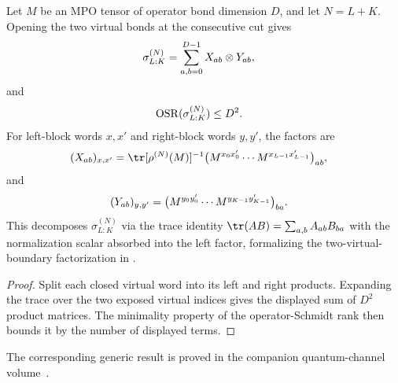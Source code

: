 \begin{lemma}
    \label{thm:mpdo_periodic_cut_operator_schmidt_rank}
    \leanok
    Let $M$ be an MPO tensor of operator bond dimension $D$, and let
    $N=L+K$. Opening the two virtual bonds at the consecutive cut gives
    \begin{align}
        \sigma^{(N)}_{L:K}
         & =\sum_{a,b=0}^{D-1} X_{ab}\otimes Y_{ab},
        \notag
    \end{align}
    and
    \begin{align}
        \operatorname{OSR}(\sigma^{(N)}_{L:K}) & \leq D^2.
        \notag
    \end{align}
    For left-block words $x,x'$ and right-block words $y,y'$, the factors are
    \begin{align}
        (X_{ab})_{x,x'}
         & =\tr[\rho^{(N)}(M)]^{-1}
        \bigl(M^{x_0x'_0}\cdots M^{x_{L-1}x'_{L-1}}\bigr)_{ab},
        \notag
    \end{align}
    and
    \begin{align}
        (Y_{ab})_{y,y'}
         & =\bigl(M^{y_0y'_0}\cdots M^{y_{K-1}y'_{K-1}}\bigr)_{ba}.
        \notag
    \end{align}
    This decomposes $\sigma^{(N)}_{L:K}$ via the trace identity
    $\tr(AB)=\sum_{a,b}A_{ab}B_{ba}$ with the normalization scalar absorbed into
    the left factor, formalizing the two-virtual-boundary factorization in
    \cite[Proposition~4.5]{Cirac2016MPDO_arXiv}.
\end{lemma}

\begin{proof}\leanok
    Split each closed virtual word into its left and right products. Expanding
    the trace over the two exposed virtual indices gives the displayed sum of
    $D^2$ product matrices. The minimality property of the operator-Schmidt
    rank then bounds it by the number of displayed terms.
\end{proof}



The corresponding generic result is proved in the companion quantum-channel volume~\cite[``Coefficient-space characterization of operator-Schmidt rank'']{QICLean2026Blueprint}.



